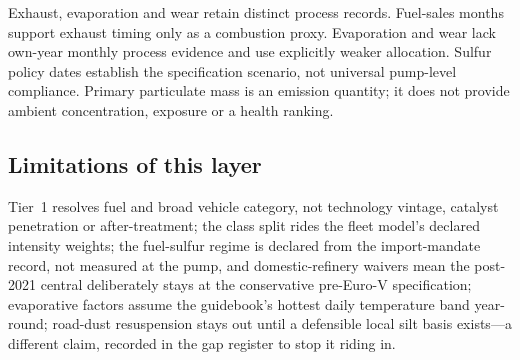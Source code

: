 Exhaust, evaporation and wear retain distinct process records. Fuel-sales months support exhaust timing only as a combustion proxy. Evaporation and wear lack own-year monthly process evidence and use explicitly weaker allocation. Sulfur policy dates establish the specification scenario, not universal pump-level compliance. Primary particulate mass is an emission quantity; it does not provide ambient concentration, exposure or a health ranking.

\subsection{Limitations of this layer}

Tier~1 resolves fuel and broad vehicle category, not technology vintage, catalyst
penetration or after-treatment; the class split rides the fleet model's declared
intensity weights; the fuel-sulfur regime is declared from the import-mandate record,
not measured at the pump, and domestic-refinery waivers mean the post-2021 central
deliberately stays at the conservative pre-Euro-V specification; evaporative factors
assume the guidebook's hottest daily temperature band year-round; road-dust
resuspension stays out until a defensible local silt basis exists---a different claim,
recorded in the gap register to stop it riding in.
